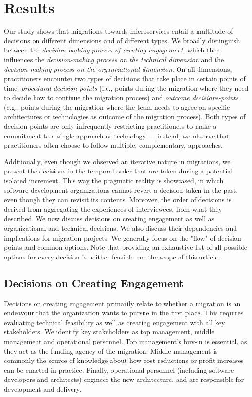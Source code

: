 \documentclass[sigconf,dvipsnames]{acmart}
\begin{document}
\section{Results}

Our study shows that migrations towards microservices entail a multitude of decisions on different dimensions and of different types. We broadly distinguish between the \emph{decision-making process of creating engagement}, which then influences the \emph{decision-making process on the technical dimension} and the \emph{decision-making process on the organizational dimension}. On all dimensions, practitioners encounter two types of decisions that take place in certain points of time: \emph{procedural decision-points} (i.e., points during the migration where they need to decide how to continue the migration process) and \emph{outcome decisions-points} (e.g.,  points during the migration where the team needs to agree on specific architectures or technologies as outcome of the migration process). Both types of decision-points are only infrequently restricting practitioners to make a commitment to a single approach or technology --- instead, we observe that practitioners often choose to follow multiple, complementary, approaches.

Additionally, even though we observed an iterative nature in migrations, we present the decisions in the temporal order that are taken during a potential isolated increment. This way the pragmatic reality is showcased, in which software development organizations cannot revert a decision taken in the past, even though they can revisit its contents. 
Moreover, the order of decisions is derived from aggregating the experiences of interviewees, from what they described. 
We now discuss decisions on creating engagement as well as organizational and technical decisions. We also discuss their dependencies and implications for migration projects. We generally focus on the "flow" of decision-points and common options. Note that providing an exhaustive list of all possible options for every decision is neither feasible nor the scope of this article.


\subsection{Decisions on Creating Engagement}

Decisions on creating engagement primarily relate to whether a migration is an endeavour that the organization wants to pursue in the first place. This requires evaluating technical feasibility as well as creating engagement with all key stakeholders. We identify key stakeholders as top management, middle management and operational personnel. Top management's buy-in is essential, as they act as the funding agency of the migration. Middle management is commonly the source of knowledge about how cost reductions or profit increases can be enacted in practice. Finally, operational personnel (including software developers and architects) engineer the new architecture, and are responsible for development and delivery. 
\end{document}
